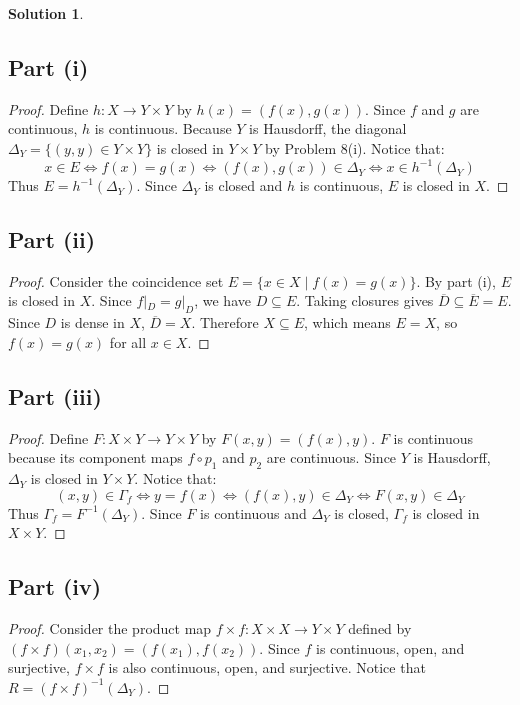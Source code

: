 \documentclass[11pt, a4paper]{article}
\theoremstyle{definition}
\newtheorem*{solution}{Solution}
\begin{document}
\begin{solution}
\subsection*{Part (i)}
\begin{proof}
Define $h : X \to Y \times Y$ by $h(x) = (f(x), g(x))$. Since $f$ and $g$ are continuous, $h$ is continuous.
Because $Y$ is Hausdorff, the diagonal $\Delta_Y = \{(y,y) \in Y \times Y\}$ is closed in $Y \times Y$ by Problem 8(i).
Notice that:
\[
x \in E \iff f(x) = g(x) \iff (f(x), g(x)) \in \Delta_Y \iff x \in h^{-1}(\Delta_Y)
\]
Thus $E = h^{-1}(\Delta_Y)$. Since $\Delta_Y$ is closed and $h$ is continuous, $E$ is closed in $X$.
\end{proof}

\subsection*{Part (ii)}
\begin{proof}
Consider the coincidence set $E = \{x \in X \mid f(x) = g(x)\}$. By part (i), $E$ is closed in $X$.
Since $f|_D = g|_D$, we have $D \subseteq E$.
Taking closures gives $\overline{D} \subseteq \overline{E} = E$.
Since $D$ is dense in $X$, $\overline{D} = X$. Therefore $X \subseteq E$, which means $E = X$, so $f(x) = g(x)$ for all $x \in X$.
\end{proof}

\subsection*{Part (iii)}
\begin{proof}
Define $F : X \times Y \to Y \times Y$ by $F(x, y) = (f(x), y)$.
$F$ is continuous because its component maps $f \circ p_1$ and $p_2$ are continuous.
Since $Y$ is Hausdorff, $\Delta_Y$ is closed in $Y \times Y$.
Notice that:
\[
(x, y) \in \Gamma_f \iff y = f(x) \iff (f(x), y) \in \Delta_Y \iff F(x, y) \in \Delta_Y
\]
Thus $\Gamma_f = F^{-1}(\Delta_Y)$. Since $F$ is continuous and $\Delta_Y$ is closed, $\Gamma_f$ is closed in $X \times Y$.
\end{proof}

\subsection*{Part (iv)}
\begin{proof}
Consider the product map $f \times f : X \times X \to Y \times Y$ defined by $(f \times f)(x_1, x_2) = (f(x_1), f(x_2))$.
Since $f$ is continuous, open, and surjective, $f \times f$ is also continuous, open, and surjective.
Notice that $R = (f \times f)^{-1}(\Delta_Y)$.


\end{proof}
\end{solution}
\end{document}

